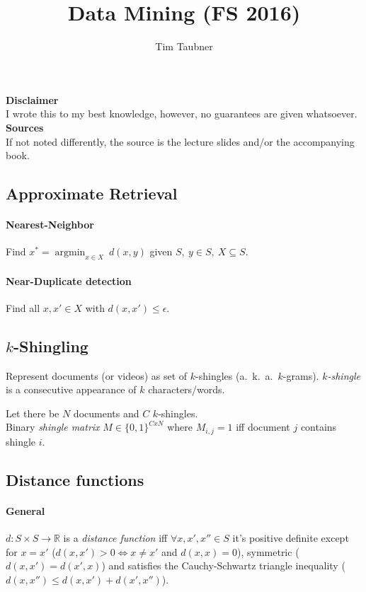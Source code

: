 \documentclass[a4paper, 9pt, DIV=24]{scrartcl}
\title{Data Mining (FS 2016)}
\author{Tim Taubner}
\DeclareMathOperator{\argmin}{argmin}
\newcommand{\eps}{\epsilon}
\newcommand{\R}{\mathbb{R}}
\begin{document}
\pagestyle{fancy}
\fancyhf{}
\fancyhead[L]{\title}

\begin{centering}
\vspace*{1em}
\vfill
\textbf{Disclaimer} \\
I wrote this to my best knowledge, however, no guarantees are given whatsoever.
\vfill
\textbf{Sources} \\
If not noted differently, the source is the lecture slides and/or the accompanying book.
\vfill
\end{centering}

\setcounter{page}{0}

\clearpage

\begin{twocolumn}

\section{Approximate Retrieval}
\paragraph{Nearest-Neighbor} Find $x^* = \argmin_{x \in X} \ d(x,y)$
given $S,\ y \in S,\ X\subseteq S$.
\paragraph{Near-Duplicate detection}
Find all $x, x'\in X$ with $d(x,x') \leq \eps$.
\subsection{$k$-Shingling}
Represent documents (or videos) as set of $k$-shingles (a.\ k.\ a.\ $k$-grams).
\emph{$k$-shingle} is a consecutive appearance of $k$ characters/words.

Let there be $N$ documents and $C$ $k$-shingles. \\
Binary \emph{shingle matrix} $M \in \{0,1\}^{CxN}$ where $M_{i,j} = 1$ iff document $j$ contains shingle $i$.
\subsection{Distance functions}
\paragraph{General}
$d: S \times S \rightarrow \R$ is a \emph{distance function} iff $\forall x,x',x''\in S$ it's positive definite except for $x=x'$ ($d(x,x') > 0 \iff x \neq x'$ and $d(x,x) = 0$), symmetric ($d(x,x') = d(x',x)$) and satisfies the Cauchy-Schwartz triangle inequality ($d(x,x'') \leq d(x,x') + d(x',x'')$).

\end{twocolumn}
\end{document}
